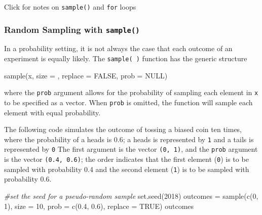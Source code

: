 \documentclass[
]{article}
\newenvironment{Shaded}{\begin{snugshade}}{\end{snugshade}}
\newcommand{\AttributeTok}[1]{\textcolor[rgb]{0.77,0.63,0.00}{#1}}
\newcommand{\CommentTok}[1]{\textcolor[rgb]{0.56,0.35,0.01}{\textit{#1}}}
\newcommand{\ConstantTok}[1]{\textcolor[rgb]{0.00,0.00,0.00}{#1}}
\newcommand{\DecValTok}[1]{\textcolor[rgb]{0.00,0.00,0.81}{#1}}
\newcommand{\FloatTok}[1]{\textcolor[rgb]{0.00,0.00,0.81}{#1}}
\newcommand{\FunctionTok}[1]{\textcolor[rgb]{0.00,0.00,0.00}{#1}}
\newcommand{\NormalTok}[1]{#1}
\newcommand{\OtherTok}[1]{\textcolor[rgb]{0.56,0.35,0.01}{#1}}
\begin{document}
Click for notes on \texttt{sample()} and \texttt{for} loops

\hypertarget{random-sampling-with-sample}{%
\subsubsection{\texorpdfstring{Random Sampling with
\texttt{sample()}}{Random Sampling with sample()}}\label{random-sampling-with-sample}}

In a probability setting, it is not always the case that each outcome of
an experiment is equally likely. The \texttt{sample(\ )} function has
the generic structure

\begin{Shaded}
\begin{Highlighting}[]
\FunctionTok{sample}\NormalTok{(x, }\AttributeTok{size =}\NormalTok{ , }\AttributeTok{replace =} \ConstantTok{FALSE}\NormalTok{, }\AttributeTok{prob =} \ConstantTok{NULL}\NormalTok{)}
\end{Highlighting}
\end{Shaded}

where the \texttt{prob} argument allows for the probability of sampling
each element in \texttt{x} to be specified as a vector. When
\texttt{prob} is omitted, the function will sample each element with
equal probability.

The following code simulates the outcome of tossing a biased coin ten
times, where the probability of a heads is 0.6; a heads is represented
by \texttt{1} and a tails is represented by \texttt{0} The first
argument is the vector \texttt{(0,\ 1)}, and the \texttt{prob} argument
is the vector \texttt{(0.4,\ 0.6)}; the order indicates that the first
element (\texttt{0}) is to be sampled with probability 0.4 and the
second element (\texttt{1}) is to be sampled with probability 0.6.

\begin{Shaded}
\begin{Highlighting}[]
\CommentTok{\#set the seed for a pseudo{-}random sample}
\FunctionTok{set.seed}\NormalTok{(}\DecValTok{2018}\NormalTok{)}
\NormalTok{outcomes }\OtherTok{=} \FunctionTok{sample}\NormalTok{(}\FunctionTok{c}\NormalTok{(}\DecValTok{0}\NormalTok{, }\DecValTok{1}\NormalTok{), }\AttributeTok{size =} \DecValTok{10}\NormalTok{, }\AttributeTok{prob =} \FunctionTok{c}\NormalTok{(}\FloatTok{0.4}\NormalTok{, }\FloatTok{0.6}\NormalTok{), }\AttributeTok{replace =} \ConstantTok{TRUE}\NormalTok{)}
\NormalTok{outcomes}
\end{Highlighting}
\end{Shaded}
\end{document}

